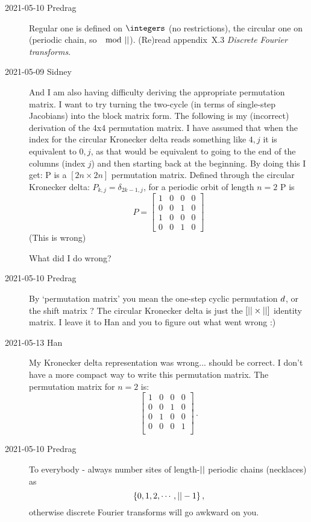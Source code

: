 \begin{description}
\item[2021-05-10 Predrag]
Regular one is defined on $\integers$ (no restrictions), the circular one
on \Cn{\cl{}} (periodic chain, so $\mod \cl{}$).
(Re)read 
{appendix~X.3} {\em Discrete Fourier transforms}.

\item[2021-05-09 Sidney]
And I am also having difficulty deriving the appropriate permutation
matrix. I want to try turning the two-cycle {\jacobianOrb} (in terms of
single-step Jacobians) into the block matrix form. The following is my
(incorrect) derivation of the 4x4 permutation matrix. I have assumed that
when the index for the circular Kronecker delta reads something like
$4,j$ it is equivalent to $0,j$, as that would be equivalent to going to
the end of the columns (index $j$) and then starting back at the
beginning. By doing this I get: P is a $[2n\times 2n]$ permutation
matrix. Defined through the circular Kronecker delta:
$P_{k,j}=\delta_{2k-1,j}$, for a periodic orbit of length $n=2$ P is
$$P=\left[\begin{matrix}
1 & 0 & 0 & 0\\
0 & 0 & 1 & 0\\
1 & 0 & 0 & 0\\
0 & 0 & 1 & 0
\end{matrix}\right]$$
(This is wrong)

What did I do wrong?

\item[2021-05-10 Predrag]
By `permutation matrix' you mean the one-step cyclic permutation
$d$, or the shift matrix ? The circular
Kronecker delta is just the $[{||}\times{\ensuremath{||}}]$  identity matrix. I
leave it to Han and you to figure out what went wrong :)

\item[2021-05-13 Han]
My Kronecker delta representation was wrong... 
should be correct. I don't have a more compact way to write this permutation
matrix. The permutation matrix for $n=2$ is:
\[
\left[
\begin{array}{cccc}
 1 & 0 & 0 & 0 \\
 0 & 0 & 1 & 0 \\
 0 & 1 & 0 & 0 \\
 0 & 0 & 0 & 1 \\
\end{array}
\right]
\, .
\]

\item[2021-05-10 Predrag]
To everybody - always number sites of length-${||}$ periodic chains
(necklaces) as
\[\{0,1,2,\cdots,{||}-1\}\,,\]
otherwise discrete Fourier transforms will go awkward on you.


\end{description}
